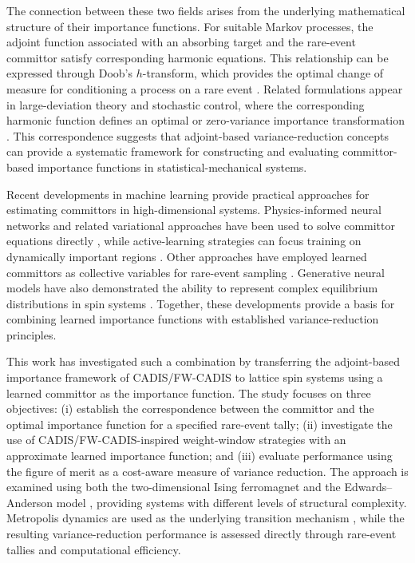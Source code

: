 \documentclass[a4paper,fleqn]{cas-sc}
\begin{document}
The connection between these two fields arises from the underlying mathematical structure of their importance functions. For suitable Markov processes, the adjoint function associated with an absorbing target and the rare-event committor satisfy corresponding harmonic equations. This relationship can be expressed through Doob's $h$-transform, which provides the optimal change of measure for conditioning a process on a rare event \cite{doob1984}. Related formulations appear in large-deviation theory and stochastic control, where the corresponding harmonic function defines an optimal or zero-variance importance transformation \cite{chetrite2015,touchette2009,hartmann2019}. This correspondence suggests that adjoint-based variance-reduction concepts can provide a systematic framework for constructing and evaluating committor-based importance functions in statistical-mechanical systems.

Recent developments in machine learning provide practical approaches for estimating committors in high-dimensional systems. Physics-informed neural networks and related variational approaches have been used to solve committor equations directly \cite{raissi2019,li2019,khoo2019}, while active-learning strategies can focus training on dynamically important regions \cite{rotskoff2020}. Other approaches have employed learned committors as collective variables for rare-event sampling \cite{trizio2025}. Generative neural models have also demonstrated the ability to represent complex equilibrium distributions in spin systems \cite{wu2019,noe2019,nicoli2020,gabrie2022}. Together, these developments provide a basis for combining learned importance functions with established variance-reduction principles.

This work has investigated such a combination by transferring the adjoint-based importance framework of CADIS/FW-CADIS to lattice spin systems using a learned committor as the importance function. The study focuses on three objectives: (i) establish the correspondence between the committor and the optimal importance function for a specified rare-event tally; (ii) investigate the use of CADIS/FW-CADIS-inspired weight-window strategies with an approximate learned importance function; and (iii) evaluate performance using the figure of merit as a cost-aware measure of variance reduction. The approach is examined using both the two-dimensional Ising ferromagnet \cite{ising1925,onsager1944} and the Edwards--Anderson model \cite{edwards1975,binder1986}, providing systems with different levels of structural complexity. Metropolis dynamics are used as the underlying transition mechanism \cite{metropolis1953}, while the resulting variance-reduction performance is assessed directly through rare-event tallies and computational efficiency.
\end{document}
